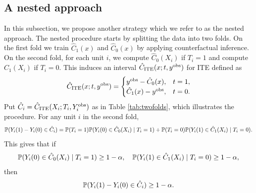 \subsection{A nested approach}\label{subsec:nest}
In this subsection,
we propose another strategy which we refer to as the nested approach. The nested procedure
starts by splitting the data into two folds. On the first fold we
train $\hat{C}_{1}(x)$ and $\hat{C}_{0}(x)$ by applying counterfactual
inference. On the second fold, for each unit $i$, we compute
$\hat{C}_{0}(X_{i})$ if $T_{i} = 1$ and compute $\hat{C}_{1}(X_{i})$
if $T_{i} = 0$. This induces an interval $\CITE(x; t, y^{\obs})$ for
ITE defined as
\[
\CITE(x; t, y^{\obs}) = 
    \begin{cases}
      y^{\obs} - \hat{C}_{0}(x), & t = 1,\\
      \hat{C}_{1}(x) - y^{\obs}, & t = 0. 
    \end{cases}
 \]
 Put $\hat{C}_{i} = \CITE(X_{i}; T_{i}, Y_{i}^{\obs})$  as in Table
 \ref{tab:twofolds}, which illustrates the procedure. For any unit $i$
 in the second fold,
\[
 \P(Y_{i}(1) - Y_{i}(0)\in \hat{C}_{i}) 
 = \P(T_{i} = 1)\P(Y_{i}(0)\in \hat{C}_{0}(X_{i}) \mid T_{i} = 1) + \P(T_{i} = 0)\P(Y_{i}(1)\in \hat{C}_{1}(X_{i}) \mid T_{i} = 0).
\]
This gives that if
\begin{equation}
  \label{eq:condition}
  \P(Y_{i}(0)\in \hat{C}_{0}(X_{i}) \mid T_{i} = 1) \ge 1 - \alpha, \quad \P(Y_{i}(1)\in \hat{C}_{1}(X_{i}) \mid T_{i} = 0)\ge 1 - \alpha,
\end{equation}
then
\begin{equation}
  \label{eq:fold2_cond}
  \P(Y_{i}(1) - Y_{i}(0)\in \hat{C}_{i})\ge 1 - \alpha.
\end{equation}



